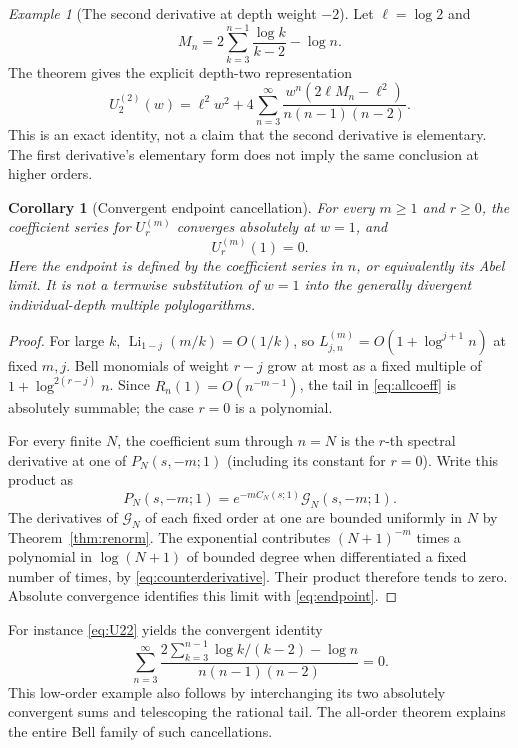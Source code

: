 \documentclass[11pt]{article}
\numberwithin{equation}{section}
\newtheorem{corollary}[theorem]{Corollary}
\theoremstyle{definition}\newtheorem{definition}[theorem]{Definition}
\theoremstyle{remark}\newtheorem{remark}[theorem]{Remark}
\newtheorem{example}[theorem]{Example}
\DeclareMathOperator{\Li}{Li}
\newcommand{\G}{\mathcal G}\newcommand{\F}{\mathfrak F}
\begin{document}
\begin{example}[The second derivative at depth weight $-2$]
Let $\ell=\log2$ and
\[
 M_n=2\sum_{k=3}^{n-1}\frac{\log k}{k-2}-\log n.
\]
The theorem gives the explicit depth-two representation
\begin{equation}
 U_2^{(2)}(w)=\ell^2w^2+
   4\sum_{n=3}^{\infty}
       \frac{w^n(2\ell M_n-\ell^2)}{n(n-1)(n-2)}.
 \label{eq:U22}
\end{equation}
This is an exact identity, not a claim that the second derivative is
elementary. The first derivative's elementary form does not imply the
same conclusion at higher orders.
\end{example}

\begin{corollary}[Convergent endpoint cancellation]
\label{cor:endpoint}
For every $m\ge1$ and $r\ge0$, the coefficient series for $U_r^{(m)}$
converges absolutely at $w=1$, and
\begin{equation}
 U_r^{(m)}(1)=0.
 \label{eq:endpoint}
\end{equation}
Here the endpoint is defined by the \emph{coefficient series in $n$}, or
equivalently its Abel limit. It is not a termwise substitution of $w=1$
into the generally divergent individual-depth multiple polylogarithms.
\end{corollary}
\begin{proof}
For large $k$, $\Li_{1-j}(m/k)=O(1/k)$, so
$L_{j,n}^{(m)}=O(1+\log^{j+1}n)$ at fixed $m,j$. Bell monomials of
weight $r-j$ grow at most as a fixed multiple of
$1+\log^{2(r-j)}n$. Since $R_n(1)=O(n^{-m-1})$, the tail in
\eqref{eq:allcoeff} is absolutely summable; the case $r=0$ is a polynomial.

For every finite $N$, the coefficient sum through $n=N$ is the $r$-th
spectral derivative at one of $P_N(s,-m;1)$ (including its constant for
$r=0$). Write this product as
\[
 P_N(s,-m;1)=e^{-mC_N(s;1)}\G_N(s,-m;1).
\]
The derivatives of $\G_N$ of each fixed order at one are bounded uniformly
in $N$ by Theorem~\ref{thm:renorm}. The exponential contributes
$(N+1)^{-m}$ times a polynomial in $\log(N+1)$ of bounded degree when
differentiated a fixed number of times, by \eqref{eq:counterderivative}.
Their product therefore tends to zero. Absolute convergence identifies
this limit with \eqref{eq:endpoint}.
\end{proof}
For instance \eqref{eq:U22} yields the convergent identity
\begin{equation}
 \sum_{n=3}^{\infty}
 \frac{2\sum_{k=3}^{n-1}\log k/(k-2)-\log n}{n(n-1)(n-2)}=0.
 \label{eq:exampleendpoint}
\end{equation}
This low-order example also follows by interchanging its two absolutely
convergent sums and telescoping the rational tail. The all-order theorem
explains the entire Bell family of such cancellations.
\end{document}
